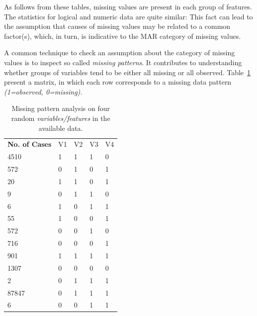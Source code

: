 As follows from these tables, missing values are present in each group of features. The statistics for logical and numeric data are quite similar: This fact can lead to the assumption that causes of missing values may be related to a common factor(s), which, in turn, is indicative to the MAR category of missing values.

A common technique to check an assumption about the category of missing values is to inspect so called \textit{missing patterns}. It contributes to understanding whether groups of variables tend to be either all missing or all observed. Table~\ref{tab:variable-pattern-example} present a matrix, in which each row corresponds to a missing data pattern \textit{(1=observed, 0=missing).} 

\begin{table}[h!]
\centering
\caption{Missing pattern analysis on four random \textit{variables/features} in the available data.}
\label{tab:variable-pattern-example}
\begin{tabular}{lllll}
\textbf{No. of Cases} & V1 & V2 & V3 & V4 \\
4510            & 1           & 1           & 1           & 0           \\
572             & 0           & 1           & 0           & 1           \\
20              & 1           & 1           & 0           & 1           \\
9               & 0           & 1           & 1           & 0           \\
6               & 1           & 0           & 1           & 1           \\
55              & 1           & 0           & 0           & 1           \\
572             & 0           & 0           & 1           & 0           \\
716             & 0           & 0           & 0           & 1           \\
901             & 1           & 1           & 1           & 1           \\
1307            & 0           & 0           & 0           & 0          \\
2               & 0           & 1           & 1           & 1           \\
87847           & 0           & 1           & 1           & 1           \\
6               & 0           & 0           & 1           & 1           \\
\end{tabular}
\end{table}

